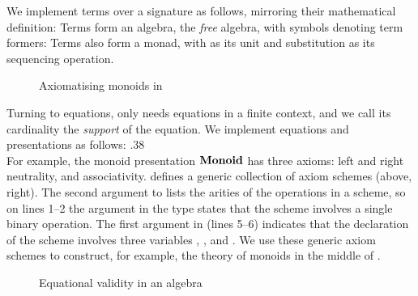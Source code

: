 We implement terms over a signature as follows, mirroring their mathematical definition:
Terms form an algebra, the \emph{free} algebra, with symbols denoting term formers:
Terms also form a monad, with  as its unit and substitution
as its sequencing operation.

\begin{figure}[t]
\MonoidAxiom{}

\MonoidTheory{}

\MonoidStructure{}

\MonoidModel{}
\caption{Axiomatising monoids in \Frexlib{}}
\end{figure}

Turning to equations, \Frexlib{} only needs
equations in a finite context, and we call its cardinality
the \emph{support} of the equation. We implement equations
and presentations as follows:
            {.38}{\AssociativityScheme[numbers=right,numbersep=-.1cm]{}}
\noindent\\[.3\baselineskip] For example, the monoid presentation
$\mathbf{Monoid}$ has three axioms: left and right neutrality, and
associativity. \Frexlib{} defines a generic collection of axiom
schemes (above, right).  The second argument to 
lists the arities \IdrisData{[n1, ..., nk]} of the operations in a
scheme, so on lines 1--2 the argument \IdrisData{[2]} in the type
\SchemeOps{} states that the scheme involves a single binary
operation.  The first argument  in \MkEquation{} (lines 5--6)
indicates that the declaration of the scheme involves three variables
\;, \;, and
\;. We use these
generic axiom schemes to construct, for example, the theory of monoids in the
middle of .


\begin{figure}[t]
\Models{}

\medskip

\Entails{}

\medskip

\ValidatesEquation{}

\medskip

\Validates{}
  \caption{Equational validity in an algebra}
\end{figure}

